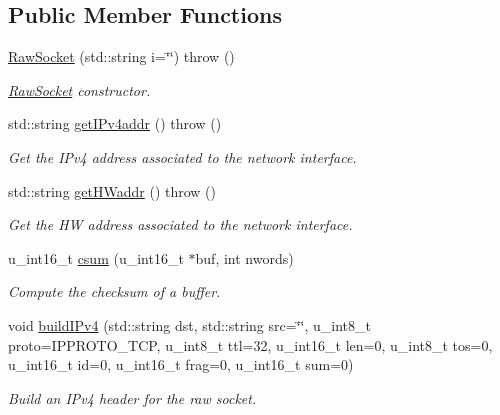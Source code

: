 \subsection*{Public Member Functions}
\begin{CompactItemize}
\item 
\hyperlink{classusock_1_1RawSocket_4eb16f88edce4337c3df518465fd5566}{RawSocket} (std::string i=\char`\"{}\char`\"{})  throw ()
\begin{CompactList}\small\item\em \hyperlink{classusock_1_1RawSocket}{RawSocket} constructor. \item\end{CompactList}\item 
std::string \hyperlink{classusock_1_1RawSocket_3b0c8f2f539982c8f37a66ebc29746a0}{getIPv4addr} ()  throw ()
\begin{CompactList}\small\item\em Get the IPv4 address associated to the network interface. \item\end{CompactList}\item 
std::string \hyperlink{classusock_1_1RawSocket_1276f5fcc7bc3b41d9d11055887ab7a9}{getHWaddr} ()  throw ()
\begin{CompactList}\small\item\em Get the HW address associated to the network interface. \item\end{CompactList}\item 
u\_\-int16\_\-t \hyperlink{classusock_1_1RawSocket_11c89cceced7302fe25163fbc74a6b83}{csum} (u\_\-int16\_\-t $\ast$buf, int nwords)
\begin{CompactList}\small\item\em Compute the checksum of a buffer. \item\end{CompactList}\item 
void \hyperlink{classusock_1_1RawSocket_1365484108821273f2c2e279f908df21}{buildIPv4} (std::string dst, std::string src=\char`\"{}\char`\"{}, u\_\-int8\_\-t proto=IPPROTO\_\-TCP, u\_\-int8\_\-t ttl=32, u\_\-int16\_\-t len=0, u\_\-int8\_\-t tos=0, u\_\-int16\_\-t id=0, u\_\-int16\_\-t frag=0, u\_\-int16\_\-t sum=0)
\begin{CompactList}\small\item\em Build an IPv4 header for the raw socket. \item\end{CompactList}\item 

\end{CompactItemize}

